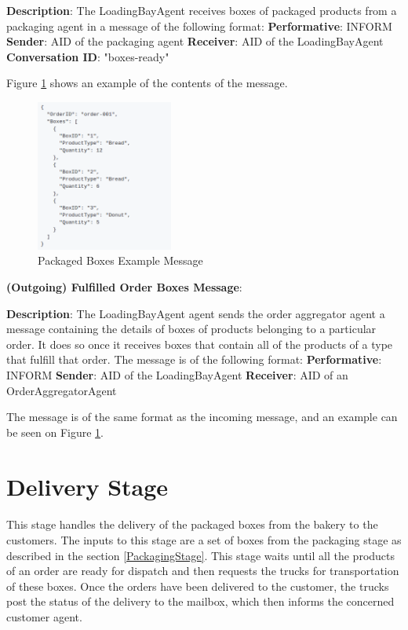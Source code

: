 \documentclass[11pt, a4paper]{article}
\begin{document}
\hfill\break
\textbf{Description}:	
The LoadingBayAgent receives boxes of packaged products from a packaging agent in a message of the following format:
\hfill\break
\textbf{Performative}: INFORM
\hfill\break
\textbf{Sender}: AID of the packaging agent
\hfill\break
\textbf{Receiver}: AID of the LoadingBayAgent
\hfill\break	
\textbf{Conversation ID}: "boxes-ready"

\hfill\break
Figure \ref{loadingbaymsg1example} shows an example of the contents of the message.
\begin{figure}[h!]
	\centering
	\includegraphics[width=0.4\textwidth]{../images/loadingbaymsg1example.png}
	\caption{Packaged Boxes Example Message}
	\label{loadingbaymsg1example}
\end{figure}

\hfill\break
\textbf{(Outgoing) Fulfilled Order Boxes Message}:
	
\hfill\break
\textbf{Description}:
The LoadingBayAgent agent sends the order aggregator agent a message containing the details of boxes of products belonging to a particular order. It does so once it receives boxes that contain all of the products of a type that fulfill that order. The message is of the following format:
\hfill\break
\textbf{Performative}: INFORM
\hfill\break
\textbf{Sender}: AID of the LoadingBayAgent
\hfill\break
\textbf{Receiver}: AID of an OrderAggregatorAgent

\hfill\break	
The message is of the same format as the incoming message, and an example can be seen on Figure \ref{loadingbaymsg1example}.

\newpage
\section{Delivery Stage}\label{DeliveryStage}
\paragraph{}
This stage handles the delivery of the packaged boxes from the bakery to the customers. The inputs to this stage are a set of boxes from the packaging stage as described in the section \ref{PackagingStage}. This stage waits until all the products of an order are ready for dispatch and then requests the trucks for transportation of these boxes. Once the orders have been delivered to the customer, the trucks post the status of the delivery to the mailbox, which then informs the concerned customer agent.
\end{document}
